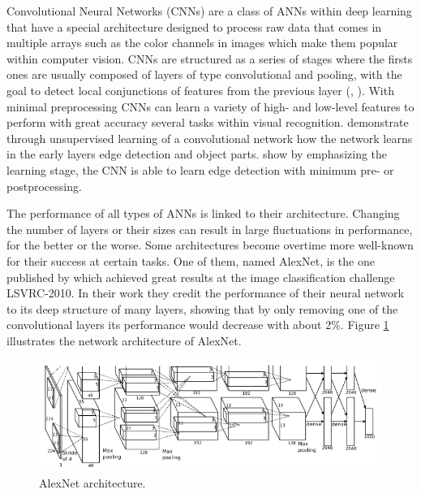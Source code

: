 Convolutional Neural Networks (CNNs) are a class of ANNs within deep learning that have a special architecture designed to process raw data that comes in multiple arrays such as the color channels in images which make them popular within computer vision. CNNs are structured as a series of stages where the firsts ones are usually composed of layers of type convolutional and pooling, with the goal to detect local conjunctions of features from the previous layer (\parencite{Lecun2015}, \parencite{Jarrett2009}). With minimal preprocessing CNNs can learn a variety of high- and low-level features to perform with great accuracy several tasks within visual recognition. \textcite{Lee2009} demonstrate through unsupervised learning of a convolutional network how the network learns in the early layers edge detection and object parts. \textcite{Turaga2010} show by emphasizing the learning stage, the CNN is able to learn edge detection with minimum pre- or postprocessing.

The performance of all types of ANNs is linked to their architecture. Changing the number of layers or their sizes can result in large fluctuations in performance, for the better or the worse. Some architectures become overtime more well-known for their success at certain tasks. One of them, named AlexNet, is the one published by \textcite{Krizhevsky2012} which achieved great results at the \textcite{ImageNet} image classification challenge LSVRC-2010. In their work they credit the performance of their neural network to its deep structure of many layers, showing that by only removing one of the convolutional layers its performance would decrease with about 2\%. Figure \ref{fig:alexnet_orig} illustrates the network architecture of AlexNet.

\begin{figure}
	\centering
	\includegraphics[width=\textwidth]{img/methods/alexnet_original.png}
	\caption{AlexNet architecture.}
	\label{fig:alexnet_orig}
\end{figure}


